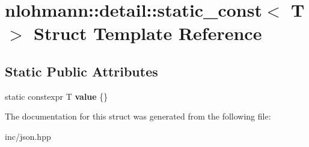 \hypertarget{structnlohmann_1_1detail_1_1static__const}{}\section{nlohmann\+:\+:detail\+:\+:static\+\_\+const$<$ T $>$ Struct Template Reference}
\label{structnlohmann_1_1detail_1_1static__const}
\subsection*{Static Public Attributes}
\begin{DoxyCompactItemize}
\item 
static constexpr T {\bfseries value} \{\}\hypertarget{structnlohmann_1_1detail_1_1static__const_a6bb7ab2ddd6abc41fb4ffb7c6dfa237e}{}\label{structnlohmann_1_1detail_1_1static__const_a6bb7ab2ddd6abc41fb4ffb7c6dfa237e}

\end{DoxyCompactItemize}


The documentation for this struct was generated from the following file\+:\begin{DoxyCompactItemize}
\item 
inc/json.\+hpp\end{DoxyCompactItemize}

